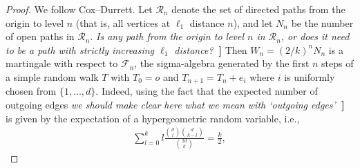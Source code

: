 \documentclass{article}
\theoremstyle{definition}
\newcommand{\1}{\mathbbm{1}}
\newcommand{\0}{\mathbf{o}}
\newcommand{\basc}[1]{{\color{blue}{ \bf [~Bas:\ }\emph{#1}\textbf{~]}}}
\begin{document}
\begin{proof}
We follow Cox--Durrett. Let $\mathcal R_n$ denote the set of directed paths from the origin to level $n$ (that is, all vertices at $\ell_1$ distance $n$), and let $N_n$ be the number of open paths in $\mathcal R_n$. \basc{Is any path from the origin to level $n$ in $\mathcal R_n$, or does it need to be a path with strictly increasing $\ell_1$ distance?} Then $W_n=(2/k)^nN_n$ is a martingale with respect to $\mathcal F_n$, the sigma-algebra generated by the first $n$ steps of a simple random walk $T$ with $T_0=o$ and $T_{n+1}=T_n+e_i$ where $i$ is uniformly chosen from $\{1,\dots ,d\}$. Indeed, using the fact that the expected number of outgoing edges \basc{ we should make clear here what we mean with `outgoing edges'}  is given by the expectation of a hypergeometric random variable, i.e., 
\begin{align*}
\sum_{l=0}^k l\frac{\binom{d}{l}\binom{d}{k-l}}{\binom{2d}{k}}=\frac{k}{2},
\end{align*}


\end{proof}
\end{document}
